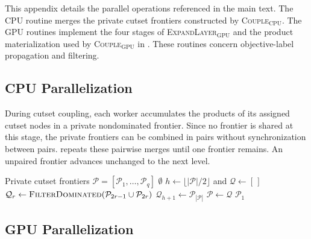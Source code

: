 \documentclass[letterpaper]{article}
\begin{document}
This appendix details the parallel operations referenced in the main text. The CPU routine merges the private cutset frontiers constructed by \textsc{Couple}$_{\mathrm{CPU}}$. The GPU routines implement the four stages of \textsc{ExpandLayer}$_{\mathrm{GPU}}$ and the product materialization used by \textsc{Couple}$_{\mathrm{GPU}}$ in . These routines concern objective-label propagation and filtering. 

\subsection{CPU Parallelization}
\label{app:cpu_implementation}

During cutset coupling, each worker accumulates the products of its assigned cutset nodes in a private nondominated frontier. Since no frontier is shared at this stage, the private frontiers can be combined in pairs without synchronization between pairs.  repeats these pairwise merges until one frontier remains. An unpaired frontier advances unchanged to the next level.

\begin{algorithm}[htbp]
\caption{CPU Tree Reduction for Cutset Frontiers}
\label{alg:cpu_tree_reduction}
\begin{algorithmic}[1]
\Require Private cutset frontiers $\mathcal{P}=[\mathcal{P}_1,\dots,\mathcal{P}_q]$
        \State \Return $\emptyset$
    \EndIf
        \State $h\gets\lfloor |\mathcal{P}|/2\rfloor$ and $\mathcal{Q}\gets[\,]$
            \State $\mathcal{Q}_r\gets
            \Call{FilterDominated}{\mathcal{P}_{2r-1}\cup\mathcal{P}_{2r}}$
        \EndFor
            \State $\mathcal{Q}_{h+1}\gets\mathcal{P}_{|\mathcal{P}|}$
        \EndIf
        \State $\mathcal{P}\gets\mathcal{Q}$
    \EndWhile
    \State \Return $\mathcal{P}_1$
\EndProcedure
\end{algorithmic}
\end{algorithm}

\subsection{GPU Parallelization}
\label{app:gpu_implementation}
\end{document}
